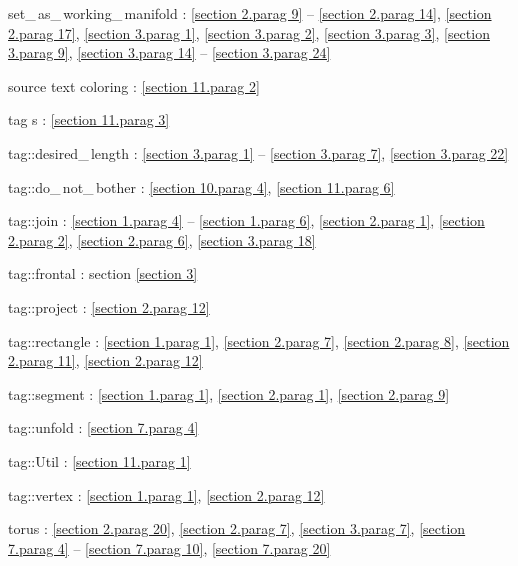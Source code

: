 \documentclass[a4paper,oneside]{scrbook}
\def\numb{}
\renewcommand\tt{\normalfont\ttfamily}
\begin{document}
\noindent
{\small\tt set\_\,as\_\,working\_\,manifold} :
\ref{\numb section 2.\numb parag 9} -- \ref{\numb section 2.\numb parag 14},
\ref{\numb section 2.\numb parag 17}, \ref{\numb section 3.\numb parag 1},
\ref{\numb section 3.\numb parag 2}, \ref{\numb section 3.\numb parag 3},
\ref{\numb section 3.\numb parag 9},
\ref{\numb section 3.\numb parag 14} -- \ref{\numb section 3.\numb parag 24}

\noindent
source text coloring : \ref{\numb section 11.\numb parag 2}

\noindent
{\small\tt\textcolor{tag}{tag}}\hskip0.5pt s : \ref{\numb section 11.\numb parag 3}
  
\noindent
{\small\tt\textcolor{tag}{tag}::desired\_\,length} :
\ref{\numb section 3.\numb parag 1} -- \ref{\numb section 3.\numb parag 7},
\ref{\numb section 3.\numb parag 22}

\noindent
{\small\tt\textcolor{tag}{tag}::do\_\,not\_\,bother} :
\ref{\numb section 10.\numb parag 4}, \ref{\numb section 11.\numb parag 6}

\noindent
{\small\tt\textcolor{tag}{tag}::join} :
\ref{\numb section 1.\numb parag 4} -- \ref{\numb section 1.\numb parag 6},
\ref{\numb section 2.\numb parag 1}, \ref{\numb section 2.\numb parag 2},
\ref{\numb section 2.\numb parag 6}, \ref{\numb section 3.\numb parag 18}

\noindent
{\small\tt\textcolor{tag}{tag}::frontal} : section \ref{\numb section 3}
  
\noindent
{\small\tt\textcolor{tag}{tag}::project} : \ref{\numb section 2.\numb parag 12}
  
\noindent
{\small\tt\textcolor{tag}{tag}::rectangle} : \ref{\numb section 1.\numb parag 1},
\ref{\numb section 2.\numb parag 7}, \ref{\numb section 2.\numb parag 8},
\ref{\numb section 2.\numb parag 11}, \ref{\numb section 2.\numb parag 12}

\noindent
{\small\tt\textcolor{tag}{tag}::segment} : \ref{\numb section 1.\numb parag 1}, 
\ref{\numb section 2.\numb parag 1}, \ref{\numb section 2.\numb parag 9}

\noindent
{\small\tt\textcolor{tag}{tag}::unfold} : \ref{\numb section 7.\numb parag 4}

\noindent
{\small\tt\textcolor{tag}{tag}::Util} : \ref{\numb section 11.\numb parag 1}
  
\noindent
{\small\tt\textcolor{tag}{tag}::vertex} : \ref{\numb section 1.\numb parag 1},
\ref{\numb section 2.\numb parag 12}
  
\noindent
torus : \ref{\numb section 2.\numb parag 20}, \ref{\numb section 2.\numb parag 7},
\ref{\numb section 3.\numb parag 7},
\ref{\numb section 7.\numb parag 4} -- \ref{\numb section 7.\numb parag 10},
\ref{\numb section 7.\numb parag 20}
\end{document}
